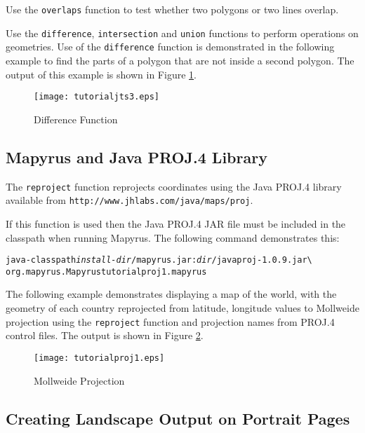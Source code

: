 Use the \texttt{overlaps} function to test whether two
polygons or two lines overlap.

Use the \texttt{difference}, \texttt{intersection} and \texttt{union}
functions to perform operations on geometries.
Use of the \texttt{difference} function is demonstrated in the
following example to find the parts of a polygon that are not inside a second
polygon.  The output of this example is shown in Figure \ref{tutorialjts3}.



\begin{figure}[htb]
\texttt{[image: tutorialjts3.eps]}
\caption{Difference Function}
\label{tutorialjts3}
\end{figure}

\subsection{Mapyrus and Java PROJ.4 Library}

The \texttt{reproject} function reprojects coordinates using
the Java PROJ.4 library available from 
\texttt{http://www.jhlabs.com/java/maps/proj}.

If this function is used then the
Java PROJ.4 JAR file must be included in the
classpath when running Mapyrus.  The following command demonstrates this:

\begin{alltt}
java -classpath \textit{install-dir}/mapyrus.jar:\textit{dir}/javaproj-1.0.9.jar \textbackslash
  org.mapyrus.Mapyrus tutorialproj1.mapyrus
\end{alltt}

The following example demonstrates displaying a map of the world,
with the geometry of each country reprojected from latitude, longitude
values to Mollweide projection using the \texttt{reproject} function
and projection names from PROJ.4 control files.
The output is shown in Figure \ref{tutorialproj1}.



\begin{figure}[htb]
\texttt{[image: tutorialproj1.eps]}
\caption{Mollweide Projection}
\label{tutorialproj1}
\end{figure}

\subsection{Creating Landscape Output on Portrait Pages}


